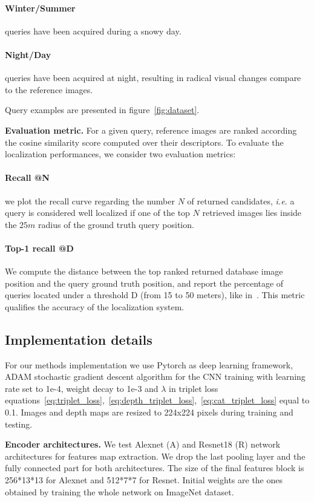 	\paragraph{Winter/Summer} queries have been acquired during a snowy day.
	\paragraph{Night/Day} queries have been acquired at night, resulting in radical visual changes compare to the reference images.

Query examples are presented in figure~\ref{fig:dataset}.
	
\noindent\textbf{Evaluation metric.} For a given query, reference images are ranked according the cosine similarity score computed over their descriptors. To evaluate the localization performances, we consider two evaluation metrics:
	\setcounter{paragraph}{0}
	\paragraph{Recall @N} we plot the recall curve regarding the number $N$ of returned candidates, {\it i.e.} a query is considered well localized if one of the top $N$ retrieved images lies inside the $25m$ radius of the ground truth query position.
	\paragraph{Top-1 recall @D} We compute the distance between the top ranked returned database image position and the query ground truth position, and report the percentage of queries located under a threshold D (from 15 to 50 meters), like in~\cite{Zamir2014}. This metric qualifies the accuracy of the localization system.

\subsection{Implementation details}
\label{subsec:implementation}

For our methods implementation we use Pytorch as deep learning framework, ADAM stochastic gradient descent algorithm for the CNN training with learning rate set to 1e-4, weight decay to 1e-3 and $\lambda$ in triplet loss equations~\ref{eq:triplet_loss},~\ref{eq:depth_triplet_loss},~\ref{eq:cat_triplet_loss} equal to 0.1. Images and depth maps are resized to 224x224 pixels during training and testing.

\noindent\textbf{Encoder architectures.} We test Alexnet (A) and Resnet18 (R) network architectures for features map extraction. We drop the last pooling layer and the fully connected part for both architectures. The size of the final features block is 256*13*13 for Alexnet and 512*7*7 for Resnet. Initial weights are the ones obtained by training the whole network on ImageNet dataset.

